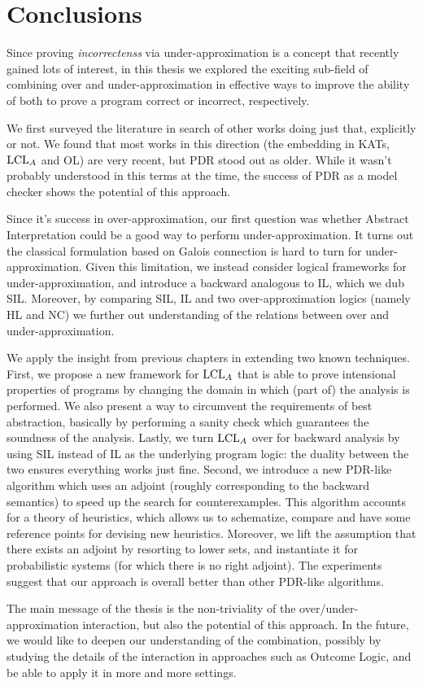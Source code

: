 
\chapter{Conclusions}\label{ch:conclusions}
Since proving \emph{incorrectenss} via under-approximation is a concept that recently gained lots of interest, in this thesis we explored the exciting sub-field of combining over and under-approximation in effective ways to improve the ability of both to prove a program correct or incorrect, respectively.

We first surveyed the literature in search of other works doing just that, explicitly or not. We found that most works in this direction (the embedding in KATs, $\text{LCL}_A$ and OL) are very recent, but PDR stood out as older. While it wasn't probably understood in this terms at the time, the success of PDR as a model checker shows the potential of this approach.

Since it's success in over-approximation, our first question was whether Abstract Interpretation could be a good way to perform under-approximation. It turns out the classical formulation based on Galois connection is hard to turn for under-approximation. Given this limitation, we instead consider logical frameworks for under-approximation, and introduce a backward analogous to IL, which we dub SIL. Moreover, by comparing SIL, IL and two over-approximation logics (namely HL and NC) we further out understanding of the relations between over and under-approximation.

We apply the insight from previous chapters in extending two known techniques.
First, we propose a new framework for $\text{LCL}_A$ that is able to prove intensional properties of programs by changing the domain in which (part of) the analysis is performed. We also present a way to circumvent the requirements of best abstraction, basically by performing a sanity check which guarantees the soundness of the analysis. Lastly, we turn $\text{LCL}_A$ over for backward analysis by using SIL instead of IL as the underlying program logic: the duality between the two ensures everything works just fine.
Second, we introduce a new PDR-like algorithm which uses an adjoint (roughly corresponding to the backward semantics) to speed up the search for counterexamples. This algorithm accounts for a theory of heuristics, which allows us to schematize, compare and have some reference points for devising new heuristics. Moreover, we lift the assumption that there exists an adjoint by resorting to lower sets, and instantiate it for probabilistic systems (for which there is no right adjoint). The experiments suggest that our approach is overall better than other PDR-like algorithms.

\fromhere
The main message of the thesis is the non-triviality of the over/under-approximation interaction, but also the potential of this approach.
In the future, we would like to deepen our understanding of the combination, possibly by studying the details of the interaction in approaches such as Outcome Logic, and be able to apply it in more and more settings.
